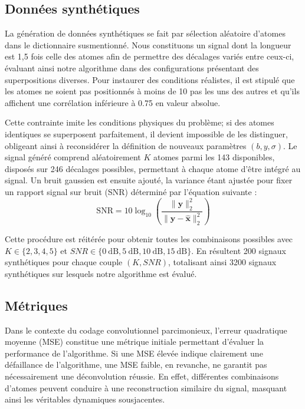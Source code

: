\documentclass[9pt,a4paper,twoside]{rho}
\begin{document}
\subsection{Données synthétiques}

La génération de données synthétiques se fait par sélection aléatoire d'atomes dans le dictionnaire susmentionné. 
Nous constituons un signal dont la longueur est 1,5 fois celle des atomes afin de permettre des décalages variés entre ceux-ci, évaluant ainsi notre algorithme dans des configurations présentant des superpositions diverses. 
Pour instaurer des conditions réalistes, il est stipulé que les atomes ne soient pas positionnés à moins de 10 pas les uns des autres et qu'ils affichent une corrélation inférieure à 0.75 en valeur absolue.

Cette contrainte imite les conditions physiques du problème; si des atomes identiques se superposent parfaitement, il devient impossible de les distinguer, obligeant ainsi à reconsidérer la définition de nouveaux paramètres $(b, y, \sigma)$. Le signal généré comprend aléatoirement $K$ atomes parmi les 143 disponibles, disposés sur 246 décalages possibles, permettant à chaque atome d'être intégré au signal. 
Un bruit gaussien est ensuite ajouté, la variance étant ajustée pour fixer un rapport signal sur bruit (SNR) déterminé par l'équation suivante :
$$
\mathrm{SNR}=10 \log _{10}\left(\frac{\|\mathbf{y}\|_2^2}{\|\mathbf{y}-\hat{\mathbf{x}}\|_2^2}\right)
$$

Cette procédure est réitérée pour obtenir toutes les combinaisons possibles avec $K \in\{2,3,4,5\}$ et $S N R \in\{0 \mathrm{~dB}, 5 \mathrm{~dB}, 10 \mathrm{~dB}, 15 \mathrm{~dB}\}$. 
En résultent 200 signaux synthétiques pour chaque couple $(K, S N R)$, totalisant ainsi 3200 signaux synthétiques sur lesquels notre algorithme est évalué.


\subsection{Métriques}

Dans le contexte du codage convolutionnel parcimonieux, l'erreur quadratique moyenne (MSE) constitue une métrique initiale permettant d'évaluer la performance de l'algorithme. 
Si une MSE élevée indique clairement une défaillance de l'algorithme, une MSE faible, en revanche, ne garantit pas nécessairement une déconvolution réussie. 
En effet, différentes combinaisons d'atomes peuvent conduire à une reconstruction similaire du signal, masquant ainsi les véritables dynamiques sousjacentes.
\end{document}
